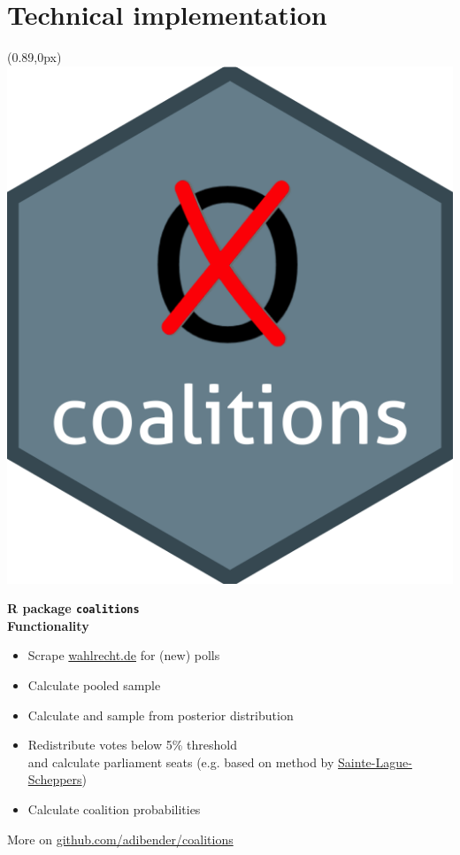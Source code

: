 \documentclass[10pt,xcolor=dvipsnames,t,headinclude,headsepline=1.5cm,usepdftitle=false]{beamer}
\begin{document}
\section{Technical implementation}

\begin{frame}[fragile]
\begin{textblock*}{1.25cm}(0.89\textwidth,0px)
\includegraphics[width=1\textwidth]{figures/coalitions_hex}
\end{textblock*}
\vspace{10px}
\textbf{R package \texttt{coalitions}}
\\[1cm]
\textbf{Functionality}
\begin{itemize}
  \item Scrape \href{https://www.wahlrecht.de/}{wahlrecht.de} for (new) polls
  \item Calculate pooled sample
  \item Calculate and sample from posterior distribution
  \item Redistribute votes below 5\% threshold \\[0.1cm]
and calculate parliament seats 
{\footnotesize (e.g. based on method by \href{http://www.wahlrecht.de/verfahren/rangmasszahlen.html}{Sainte-Lague-Scheppers})}
  \item Calculate coalition probabilities
\end{itemize}
\bigskip
More on \href{https://github.com/adibender/coalitions/}{github.com/adibender/coalitions}
\end{frame}
\end{document}
